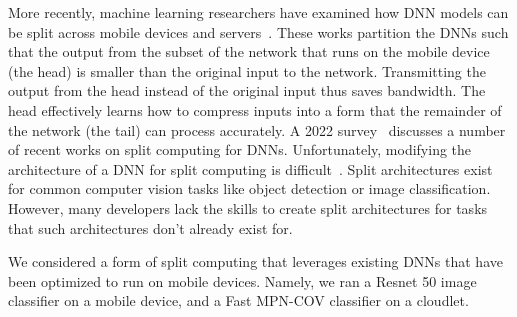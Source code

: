 More recently, machine learning researchers have examined how DNN models can be
split across mobile devices and servers~\cite{Kang2017, Hsu2019, Eshratifar2019,
  Matsubara2019}.
These works partition the DNNs such that the output from the subset of the
network that runs on the mobile device (the head) is smaller than the
original input to the network.
Transmitting the output from the head instead of the original input thus saves
bandwidth.
The head effectively learns how to compress inputs into a form that the
remainder of the network (the tail) can process accurately.
A 2022 survey~\cite{Matsubara2022} discusses a number of recent works on split
computing for DNNs.
Unfortunately, modifying the architecture of a DNN for split computing is
difficult~\cite{Matsubara2020}.
Split architectures exist for common computer vision tasks like object detection
or image classification.
However, many developers lack the skills to create split architectures for tasks
that such architectures don't already exist for.

We considered a form of split computing that leverages existing DNNs that have
been optimized to run on mobile devices.
Namely, we ran a Resnet 50 image classifier on a mobile device,
and a Fast MPN-COV classifier on a cloudlet.
